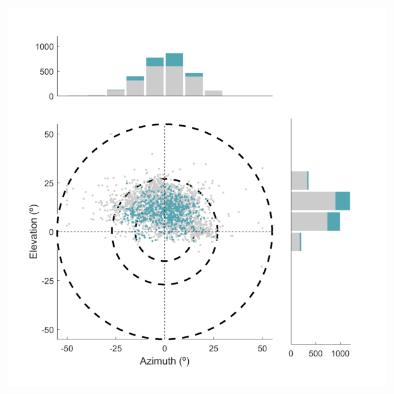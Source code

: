 \begin{figure}[H] \centering \includegraphics[width=10cm,height=10cm,keepaspectratio]{Figures/7.Results/finalPopulation/sel/popPlots_rfPositions_allSessions.png} 
\end{figure}


%
%

